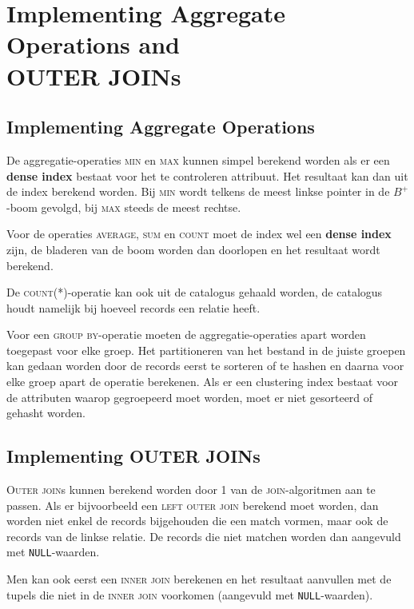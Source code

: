 \section[Implementing Aggregate Operations and OUTER JOINs]{Implementing Aggregate Operations and\\ OUTER JOINs}
\subsection{Implementing Aggregate Operations}
De aggregatie-operaties \textsc{min} en \textsc{max} kunnen simpel berekend worden als er een \textbf{dense index} bestaat voor het te controleren attribuut. Het resultaat kan dan uit de index berekend worden. Bij \textsc{min} wordt telkens de meest linkse pointer in de $B^+$-boom gevolgd, bij \textsc{max} steeds de meest rechtse.

Voor de operaties \textsc{average}, \textsc{sum} en \textsc{count} moet de index wel een \textbf{dense index} zijn, de bladeren van de boom worden dan doorlopen en het resultaat wordt berekend.

De \textsc{count}(*)-operatie kan ook uit de catalogus gehaald worden, de catalogus houdt namelijk bij hoeveel records een relatie heeft.

Voor een \textsc{group by}-operatie moeten de aggregatie-operaties apart worden toegepast voor elke groep. Het partitioneren van het bestand in de juiste groepen kan gedaan worden door de records eerst te sorteren of te hashen en daarna voor elke groep apart de operatie berekenen. Als er een clustering index bestaat voor de attributen waarop gegroepeerd moet worden, moet er niet gesorteerd of gehasht worden.


\subsection{Implementing OUTER JOINs}
\textsc{Outer join}s kunnen berekend worden door 1 van de \textsc{join}-algoritmen aan te passen. Als er bijvoorbeeld een \textsc{left outer join} berekend moet worden, dan worden niet enkel de records bijgehouden die een match vormen, maar ook de records van de linkse relatie. De records die niet matchen worden dan aangevuld met \texttt{NULL}-waarden.

Men kan ook eerst een \textsc{inner join} berekenen en het resultaat aanvullen met de tupels die niet in de \textsc{inner join} voorkomen (aangevuld met \texttt{NULL}-waarden).



